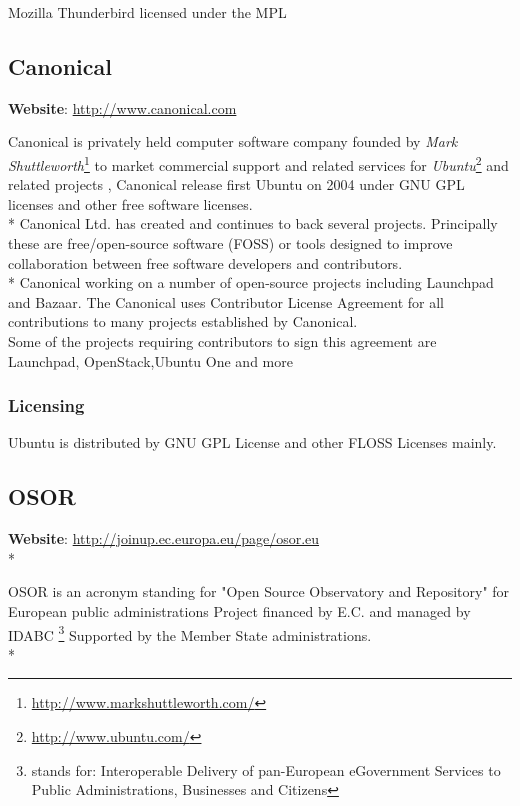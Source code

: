 \documentclass[11pt]{article} %
\begin{document}
Mozilla Thunderbird  licensed under the MPL 

\subsection{Canonical} %

\textbf{Website}: \url{http://www.canonical.com}

Canonical is privately held computer software company founded by \emph{Mark Shuttleworth}\footnote{\url{http://www.markshuttleworth.com/}} to market commercial support and related services for \emph{Ubuntu}\footnote{\url{http://www.ubuntu.com/}} and related projects , Canonical release first Ubuntu on 2004  under GNU GPL licenses and other free software licenses.\\*
Canonical Ltd. has created and continues to back several projects. Principally these are free/open-source software (FOSS) or tools designed to improve collaboration between free software developers and contributors.\\*
Canonical working on a number of open-source projects including Launchpad and Bazaar.
The Canonical uses  Contributor License Agreement for all contributions to many projects established by Canonical.\\
Some of the projects requiring contributors to sign this agreement are Launchpad, OpenStack,Ubuntu One and more 

\subsubsection{Licensing}

Ubuntu is distributed by GNU GPL License and other FLOSS Licenses mainly.

\subsection{OSOR} %

\textbf{Website}: \url {http://joinup.ec.europa.eu/page/osor.eu}\\*

OSOR is an acronym standing for "Open Source Observatory and Repository" for European public administrations
Project financed by E.C. and managed by IDABC \footnote {stands for: Interoperable Delivery of pan-European eGovernment Services to Public Administrations, Businesses and Citizens}
Supported by the Member State administrations.\\*
\end{document}
